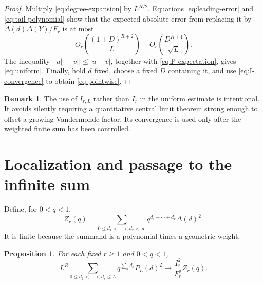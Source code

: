 \documentclass[11pt]{article}
\numberwithin{equation}{section}
\newtheorem{proposition}[proposition]{Proposition}
\theoremstyle{definition}
\newtheorem{remark}[remark]{Remark}
\newcommand{\vander}{\Delta}
\begin{document}
\begin{proof}
Multiply \eqref{eq:degree-expansion} by $L^{R/2}$. Equations \eqref{eq:leading-error} and \eqref{eq:tail-polynomial} show that the expected absolute error from replacing it by $\vander(d)\vander(Y)/F_r$ is at most
\[
 O_r\!\left(\frac{(1+D)^{R+2}}{L}\right)
 +O_r\!\left(\frac{D^{R+1}}{\sqrt L}\right).
\]
The inequality $\bigl||u|-|v|\bigr|\leq|u-v|$, together with \eqref{eq:P-expectation}, gives \eqref{eq:uniform}. Finally, hold $d$ fixed, choose a fixed $D$ containing it, and use \eqref{eq:I-convergence} to obtain \eqref{eq:pointwise}.
\end{proof}

\begin{remark}
The use of $I_{r,L}$ rather than $I_r$ in the uniform estimate is intentional. It avoids silently requiring a quantitative central limit theorem strong enough to offset a growing Vandermonde factor. Its convergence is used only after the weighted finite sum has been controlled.
\end{remark}

\section{Localization and passage to the infinite sum}\label{sec:localization}

Define, for $0<q<1$,
\begin{equation}\label{eq:Zdef}
 Z_r(q)=\sum_{0\leq d_1<\cdots<d_r<\infty}
 q^{d_1+\cdots+d_r}\vander(d)^2.
\end{equation}
It is finite because the summand is a polynomial times a geometric weight.

\begin{proposition}\label{prop:limit-sum}
For each fixed $r\geq1$ and $0<q<1$,
\begin{equation}\label{eq:limit-sum}
 L^R\sum_{0\leq d_1<\cdots<d_r\leq L}q^{\sum_a d_a}P_L(d)^2
 \longrightarrow\frac{I_r^2}{F_r^2}Z_r(q).
\end{equation}
\end{proposition}
\end{document}

